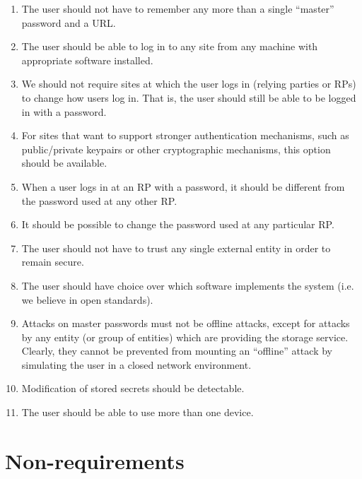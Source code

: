 \documentclass[a4paper,titlepage]{article}
\begin{document}
\begin{enumerate}

  \item The user should not have to remember any more than a single
    ``master'' password and a URL.

  \item The user should be able to log in to any site from any machine
    with appropriate software installed.

  \item We should not require sites at which the user logs in (relying
    parties or RPs) to change how users log in. That is, the user
    should still be able to be logged in with a password.

  \item For sites that want to support stronger authentication
    mechanisms, such as public/private keypairs or other cryptographic
    mechanisms, this option should be available.

  \item When a user logs in at an RP with a password, it should be
    different from the password used at any other RP.

  \item It should be possible to change the password used at any
    particular RP.

  \item The user should not have to trust any single external entity
    in order to remain secure.

  \item The user should have choice over which software implements the
    system (i.e. we believe in open standards).

  \item Attacks on master passwords must not be offline attacks,
    except for attacks by any entity (or group of entities) which are
    providing the storage service. Clearly, they cannot be prevented
    from mounting an ``offline'' attack by simulating the user in a
    closed network environment.

  \item Modification of stored secrets should be detectable.

  \item The user should be able to use more than one device.

\end{enumerate}

\section{Non-requirements}
\end{document}
